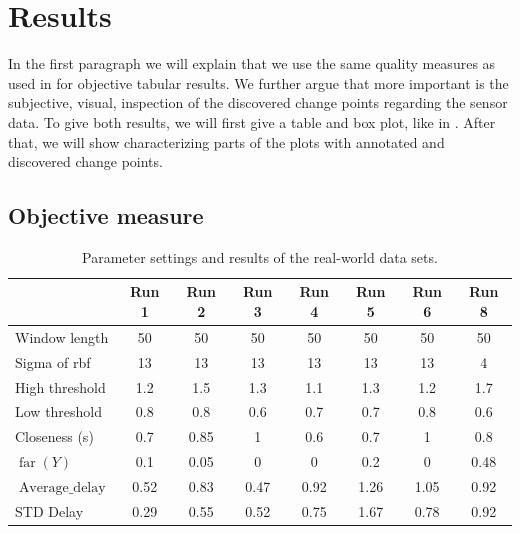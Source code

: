 \section{Results}\label{sec:real_world_results}


In the first paragraph we will explain that we use the same quality measures as used in  for objective tabular results.
We further argue that more important is the subjective, visual, inspection of the discovered change points regarding the sensor data.
To give both results, we will first give a table and box plot, like in .
After that, we will show characterizing parts of the plots with annotated and discovered change points.

\subsection{Objective measure}


\begin{table}
  \centering
  \begin{tabulary}{\textwidth}{|l|c|c|c|c|c|c|c|}
     & Run 1 & Run 2 & Run 3 & Run 4 & Run 5 & Run 6 & Run 8 \\
    \hline
    Window length & 50 & 50 & 50 & 50 & 50 & 50 & 50 \\
    \hline
    Sigma of \gls{rbf} & 13 & 13 & 13 & 13 & 13 & 13 & 4 \\
    \hline
    High threshold & 1.2 & 1.5 & 1.3 & 1.1 & 1.3 & 1.2 & 1.7 \\
    \hline
    Low threshold & 0.8 & 0.8 & 0.6 & 0.7 & 0.7 & 0.8 & 0.6 \\
    \hline
    Closeness (s) & 0.7 & 0.85 & 1 & 0.6 & 0.7 & 1 & 0.8 \\
    \hline
    \hline
    $\operatorname*{far}(Y)$ & 0.1 & 0.05 & 0 & 0 & 0.2 & 0 & 0.48 \\
    \hline
    $\operatorname*{Average\_delay}$ & 0.52 & 0.83 & 0.47 & 0.92 & 1.26 & 1.05 & 0.92 \\
    \hline
    STD Delay & 0.29 & 0.55 & 0.52 & 0.75 & 1.67 & 0.78 & 0.92 \\
    \hline
  \end{tabulary}
  \caption[Results real world runs]{Parameter settings and results of the real-world data sets.}
  \label{tab:results_real_world}
\end{table}


